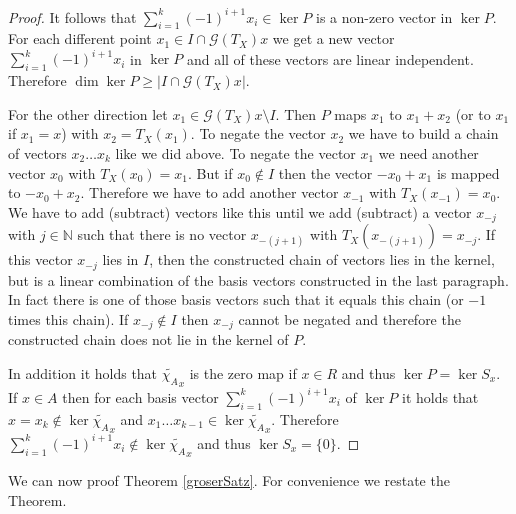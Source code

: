 \documentclass[12pt,a4paper]{scrartcl}
\theoremstyle{plain}
\theoremstyle{definition}
\newcommand{\N}{\mathbb{N}} %
\newcommand{\2}{\mathbb{Z} / 2 \mathbb{Z}}
\newcommand{\G}{\mathcal{G}}
\newcommand{\1}{\bar{1}}
\newcommand{\0}{\bar{0}}
\begin{document}
\begin{proof}
	It follows that $\sum_{i = 1}^{k} (-1)^{i + 1} x_i \in \ker P$ is a non-zero vector in $ \ker P$. For each different point $x_1 \in  I \cap \G (T_X)x$ we get a new vector $\sum_{i = 1}^{k} (-1)^{i + 1} x_i$ in $\ker P$ and all of these vectors are linear independent. Therefore $\dim \ker P \ge |I \cap \G (T_X)x| $.
	
	For the other direction let $x_1 \in \G (T_X)x \setminus I$. Then $P$ maps $x_1$ to $x_1 + x_2$ (or to $x_1$ if $x_1=x$) with $x_2 = T_X(x_1)$. To negate the vector $x_2$  we have to build a chain of vectors $x_2 \ldots x_k$ like we did above. To negate the vector $x_1$ we need another vector $x_0$ with $T_X(x_0) = x_1$. But if $x_0 \notin I$ then the vector $-x_0 + x_1$ is mapped to $-x_0 + x_2$. Therefore we have to add another vector $x_{-1}$ with $T_X(x_{-1}) = x_0$. We have to add (subtract) vectors like this until we add (subtract) a vector $x_{-j}$ with $j \in \N$ such that there is no vector $x_{-(j+1)}$ with $T_X(x_{-(j+1)}) = x_{-j}$. If this vector $x_{-j}$ lies in $I$, then the constructed chain of vectors lies in the kernel, but is a linear combination of the basis vectors constructed in the last paragraph. In fact there is one of those basis vectors such that it equals this chain (or $-1$ times this chain). If $x_{-j} \notin I$ then $x_{-j}$ cannot be negated and therefore the constructed chain does not lie in the kernel of $P$.
	
	
	In addition it holds that $\widetilde{\chi_A}_x$ is the zero map if $x \in R$ and thus $\ker P = \ker S_x$. If $x \in A$ then for each basis vector $\sum_{i = 1}^{k} (-1)^{i + 1} x_i$ of $\ker P$  it holds that $x = x_k \notin \ker \widetilde{\chi_A}_x$ and $x_1 \ldots x_{k - 1} \in \ker \widetilde{\chi_A}_x$. Therefore $\sum_{i = 1}^{k} (-1)^{i + 1} x_i \notin \ker \widetilde{\chi_A}_x$ and thus $\ker S_x = \{0\}$.
\end{proof}
We can now proof Theorem \ref{groserSatz}. For convenience we restate the Theorem.
\groserSatz*
\end{document}
